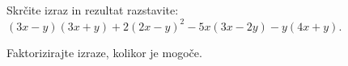 \documentclass[addpoints]{exam}
\begin{document}
\begin{questions}


        


    \question[5]
    Skrčite izraz in rezultat razstavite: $(3x-y)(3x+y)+2(2x-y)^2-5x(3x-2y)-y(4x+y)$.

    

    \question
    Faktorizirajte izraze, kolikor je mogoče.
    \begin{parts}





\end{parts}
\end{questions}
\end{document}
